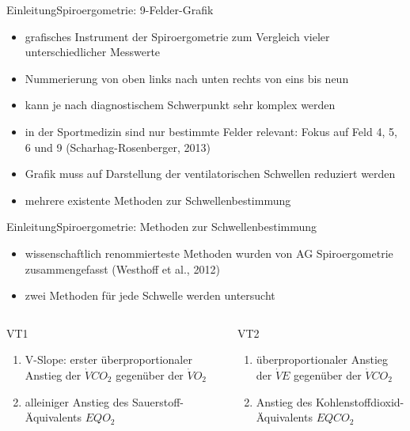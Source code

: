 \documentclass[
handout, 
aspectratio=141, 
10pt,
xcolor=dvipsnames]
{beamer}
\begin{document}
\begin{frame}{Einleitung}{Spiroergometrie: 9-Felder-Grafik}
\begin{itemize}
	\item grafisches Instrument der Spiroergometrie zum Vergleich vieler unterschiedlicher Messwerte
	\item Nummerierung von oben links nach unten rechts von eins bis neun
	\item kann je nach diagnostischem Schwerpunkt sehr komplex werden
	\item in der Sportmedizin sind nur bestimmte Felder relevant: Fokus auf Feld 4, 5, 6 und 9 (Scharhag-Rosenberger, 2013)
	\item Grafik muss auf Darstellung der ventilatorischen Schwellen reduziert werden
	\item mehrere existente Methoden zur Schwellenbestimmung
\end{itemize}
\end{frame}

\begin{frame}{Einleitung}{Spiroergometrie: Methoden zur Schwellenbestimmung}
\begin{itemize}
	\item wissenschaftlich renommierteste Methoden wurden von AG Spiroergometrie zusammengefasst (Westhoff et al., 2012)
	\item zwei Methoden für jede Schwelle werden untersucht
\end{itemize}
\begin{columns}
	\begin{column}{5cm}
		\begin{block}{VT1}
			\begin{enumerate}
				\item V-Slope: erster überproportionaler Anstieg der $\dot{V}CO_2$ gegenüber der $\dot{V}O_2$
				\item alleiniger Anstieg des Sauerstoff-Äquivalents $EQO_2$
			\end{enumerate}
		\end{block}
	\end{column}
	\begin{column}{5cm}
		\begin{block}{VT2}
			\begin{enumerate}
				\item überproportionaler Anstieg der $\dot{V}E$ gegenüber der $\dot{V}CO_2$
				\item Anstieg des Kohlenstoffdioxid-Äquivalents $EQCO_2$
			\end{enumerate}
		\end{block}
	\end{column}
\end{columns}
\end{frame}
\end{document}
